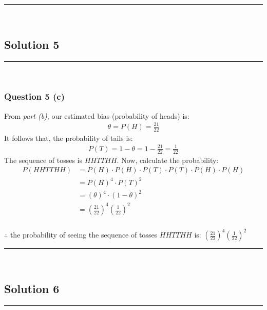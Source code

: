 \documentclass{article}
\begin{document}
\noindent\rule{\textwidth}{0.4pt}\\

\newpage

\subsection*{Solution 5}
\noindent\rule{\textwidth}{0.4pt}\\
\subsubsection*{Question 5 (c)}
From \textit{part (b)}, our estimated bias (probability of heads) is:
\begin{align*}
    \theta = P(H) = \frac{21}{22}
\end{align*}
It follows that, the probability of tails is:
\begin{align*}
    P(T) = 1 - \theta = 1 - \frac{21}{22} = \frac{1}{22}
\end{align*}
The sequence of tosses is $HHTTHH$. Now, calculate the probability:
\begin{align*}
    P(HHTTHH) &= P(H) \cdot P(H) \cdot P(T) \cdot P(T) \cdot P(H) \cdot P(H) \\
              &= P(H)^4 \cdot P(T)^2 \\
              &= (\theta)^4 \cdot (1-\theta)^2 \\
              &= \left(\frac{21}{22}\right)^4 \left(\frac{1}{22}\right)^2
\end{align*}

\subsubsection*{\normalfont}{$\therefore$ the probability of seeing the sequence of tosses $HHTTHH$ is: $\left(\frac{21}{22}\right)^4 \left(\frac{1}{22}\right)^2$} \\

\noindent\rule{\textwidth}{0.4pt}\\

\newpage

\subsection*{Solution 6}
\noindent\rule{\textwidth}{0.4pt}\\
\end{document}
